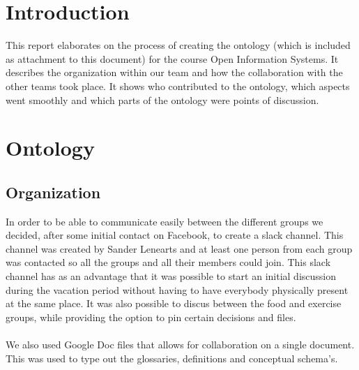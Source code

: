 

\maketitlepage


\section{Introduction}
This report elaborates on the process of creating the ontology (which is included as attachment to this document) for the course Open Information Systems. It describes the organization within our team and how the collaboration with the other teams took place. It shows who contributed to the ontology, which aspects went smoothly and which parts of the ontology were points of discussion.  





\section{Ontology}

\subsection{Organization}

In order to be able to communicate easily between the different groups we decided, after some initial contact on Facebook, to create a slack channel. This channel was created by Sander Lenearts and at least one person from each group was contacted so all the groups and all their members could join. This slack channel has as an advantage that it was possible to start an initial discussion during the vacation period without having to have everybody physically present at the same place. It was also possible to discus between the food and exercise groups, while providing the option to pin certain decisions and files.\\ \\
We also used Google Doc files that allows for collaboration on a single document. This was used to type out the glossaries, definitions and conceptual schema's.

